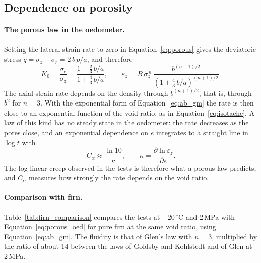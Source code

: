 \subsection{Dependence on porosity}
\label{subsec:cal_porosity}

\paragraph{The porous law in the oedometer.} Setting the lateral strain rate to zero in Equation~\eqref{eq:porous} gives the deviatoric stress $q = \sigma_z - \sigma_r = 2\,b\,p/a$, and therefore
\begin{equation}
    K_0 = \frac{\sigma_r}{\sigma_z} = \frac{1 - \tfrac{2}{3}\,b/a}{1 + \tfrac{4}{3}\,b/a}, \qquad
    \dot\varepsilon_z = B\,\sigma_z^{\,n}\,\frac{b^{(n+1)/2}}{\left(1 + \tfrac{4}{3}\,b/a\right)^{(n+1)/2}}.
    \label{eq:porous_oed}
\end{equation}
The axial strain rate depends on the density through $b^{(n+1)/2}$, that is, through $b^2$ for $n = 3$. With the exponential form of Equation~\eqref{eq:ab_gm} the rate is then close to an exponential function of the void ratio, as in Equation~\eqref{eq:isotache}. A law of this kind has no steady state in the oedometer: the rate decreases as the pores close, and an exponential dependence on $e$ integrates to a straight line in $\log t$ with
\begin{equation}
    C_\alpha \approx \frac{\ln10}{\kappa}, \qquad \kappa = \frac{\partial\ln\dot\varepsilon_z}{\partial e}.
    \label{eq:calpha_kappa}
\end{equation}
The log-linear creep observed in the tests is therefore what a porous law predicts, and $C_\alpha$ measures how strongly the rate depends on the void ratio.

\paragraph{Comparison with firn.} Table~\ref{tab:firn_comparison} compares the tests at $-20\,^\circ$C and 2\,MPa with Equation~\eqref{eq:porous_oed} for pure firn at the same void ratio, using Equation~\eqref{eq:ab_gm}. The fluidity is that of Glen's law with $n = 3$, multiplied by the ratio of about 14 between the laws of Goldsby and Kohlstedt and of Glen at 2\,MPa.

